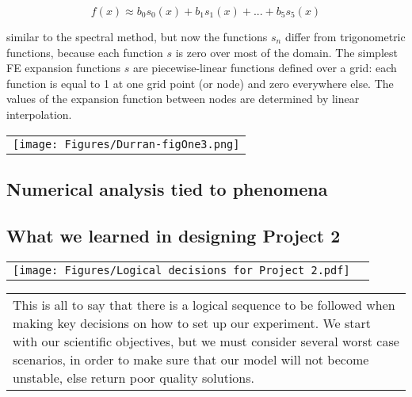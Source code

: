 	\begin{equation}
		f(x)\approx b_0s_0(x)+b_1s_1(x)+...+b_5s_5(x)
	\end{equation}	

	similar to the spectral method, but now the functions $s_n$ differ from trigonometric functions, because each function $s$ is zero over most of the domain. The simplest FE expansion functions $s$ are piecewise-linear functions defined over a grid: each function is equal to 1 at one grid point (or node) and zero everywhere else. The values of the expansion function between nodes are determined by linear interpolation.
	
	\begin{center}
		\begin{tabular}{c}
			\texttt{[image: Figures/Durran-figOne3.png]}
		\end{tabular}
	\end{center}
	

\subsection{Numerical analysis tied to phenomena}
\subsection{What we learned in designing Project 2}

	
\begin{center}
	\begin{tabular}{cc}
			\texttt{[image: Figures/Logical decisions for Project 2.pdf]}
	\end{tabular}
\end{center}

\begin{tabular}{l}
			This is all to say that there is a logical sequence to be followed when making key decisions on how to set up our experiment. We start with our scientific objectives, but we must consider several worst case scenarios, in order to make sure that our model will not become unstable, else return poor quality solutions.
\end{tabular}		



